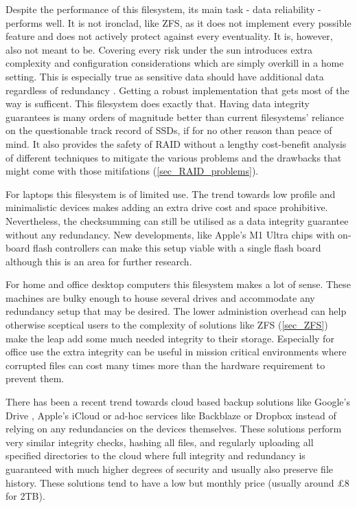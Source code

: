 
        Despite the performance of this filesystem, its main task - data
        reliability - performs well. It is not ironclad, like ZFS, as it does
        not implement every possible feature and does not actively protect
        against every eventuality. It is, however, also not meant to be.
        Covering every risk under the sun introduces extra complexity and
        configuration considerations which are simply overkill in a home
        setting. This is especially true as sensitive data should have
        additional data regardless of redundancy \cite{Backblaze_321}. Getting
        a robust implementation that gets most of the way is sufficent. This
        filesystem does exactly that. Having data integrity guarantees is many
        orders of magnitude better than current filesystems' reliance on the
        questionable track record of SSDs, if for no other reason than peace of
        mind. It also provides the safety of RAID without a lengthy
        cost-benefit analysis of different techniques to mitigate the various
        problems and the drawbacks that might come with those mitifations
        (\ref{sec_RAID_problems}).

        For laptops this filesystem is of limited use. The trend towards low
        profile and minimalistic devices makes adding an extra drive cost and
        space prohibitive. Nevertheless, the checksumming can still be utilised
        as a data integrity guarantee without any redundancy. New developments,
        like Apple's M1 Ultra chips with on-board flash controllers
        \cite{m1_ultra_controller} can make this setup viable with a single
        flash board although this is an area for further research.

        For home and office desktop computers this filesystem makes a lot of
        sense. These machines are bulky enough to house several drives and
        accommodate any redundancy setup that may be desired. The lower
        administion overhead can help otherwise sceptical users to the
        complexity of solutions like ZFS (\ref{sec_ZFS}) make the leap add some
        much needed integrity to their storage. Especially for office use the
        extra integrity can be useful in mission critical environments where
        corrupted files can cost many times more than the hardware requirement
        to prevent them.

        There has been a recent trend towards cloud based backup solutions like
        Google's Drive \cite{gdrive}, Apple's iCloud \cite{icloud} or ad-hoc
        services like Backblaze \cite{Backblaze_321} or Dropbox \cite{dropbox}
        instead of relying on any redundancies on the devices themselves. These
        solutions perform very similar integrity checks, hashing all files, and
        regularly uploading all specified directories to the cloud where full
        integrity and redundancy is guaranteed \cite{Backblaze_arch} with much
        higher degrees of security and usually also preserve file history.
        These solutions tend to have a low but monthly price (usually around
        £8 for 2TB).

